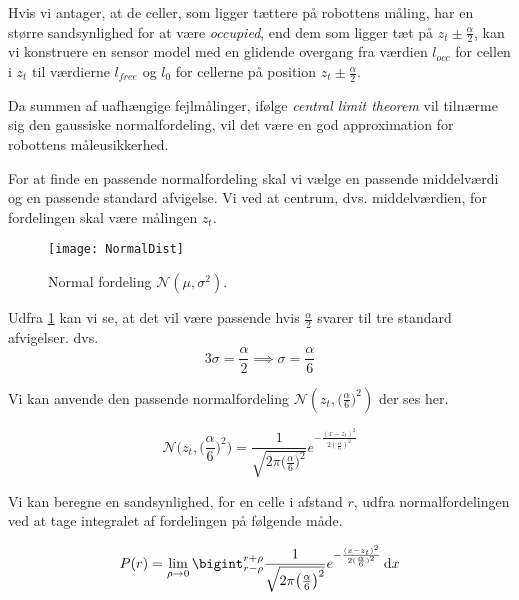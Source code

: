 Hvis vi antager, at de celler, som ligger tættere på robottens måling, har en større sandsynlighed for at være \emph{occupied}, end dem som ligger tæt på $z_t \pm \frac{\alpha}{2}$, kan vi konstruere en sensor model med en glidende overgang fra værdien $l_{occ}$ for cellen i $z_t$ til værdierne $l_{free}$ og $l_0$ for cellerne på position $z_t \pm \frac{\alpha}{2}$. 

Da summen af uafhængige fejlmålinger, ifølge \emph{central limit theorem} vil tilnærme sig
den gaussiske normalfordeling, vil det være en god approximation for robottens måleusikkerhed.\cite[p. 223]{ArtificialIntelligence}

For at finde en passende normalfordeling skal vi vælge en passende middelværdi og en passende standard afvigelse. 
Vi ved at centrum, dvs. middelværdien, for fordelingen skal være målingen $z_t$.

\begin{figure}
\centering \texttt{[image: NormalDist]}
\caption{Normal fordeling $\mathcal{N}(\mu,\sigma^2)$.}
\label{normaldistimg}
\end{figure}

Udfra \cref{normaldistimg} kan vi se, at det vil være passende hvis $\frac{\alpha}{2}$ svarer til tre standard afvigelser. dvs.
\begin{equation}
	3\sigma = \frac{\alpha}{2} \implies \sigma = \frac{\alpha}{6}
\end{equation}

Vi kan anvende den passende normalfordeling $\mathcal{N}(z_t,\big(\frac{\alpha}{6}\big)^2)$ der ses her. 

\begin{equation}
\mathcal{N}\bigg(z_t,\bigg(\frac{\alpha}{6}\bigg)^2\bigg) = 
\frac{1}{\sqrt{2 \pi \big(\frac{\alpha}{6}\big)^2}}e^{- \frac{(x - z_t)^2}{2 (\frac{\alpha}{6})^2}}
\end{equation}

Vi kan beregne en sandsynlighed, for en celle i afstand $r$, udfra normalfordelingen ved at tage integralet af fordelingen på følgende måde.

\begin{equation}
P(r) = \lim \limits_{\rho \to 0} \bigint_{r-\rho}^{r+\rho} \frac{1}{\sqrt{2 \pi \big(\frac{\alpha}{6}\big)^2}}e^{- \frac{(x - z_t)^2}{2 (\frac{\alpha}{6})^2}}\, \mathrm{d}x
\end{equation}


